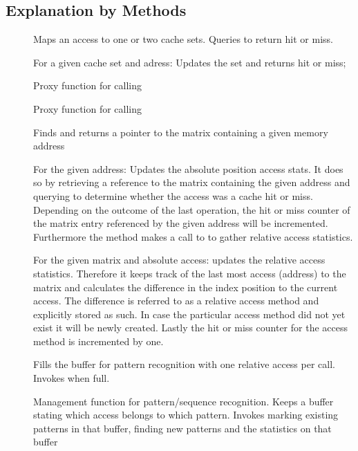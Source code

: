 \subsection{Explanation by Methods}

\begin{description} %
\item[] Maps an access to one or two cache sets. Queries  to return hit or miss.
\item[] For a given cache set and adress: Updates the set and returns hit or miss;
\item[] Proxy function for calling 
\item[] Proxy function for calling 
\item[] Finds and returns a pointer to the matrix containing a given memory address
\item[] For the given address: Updates the absolute position
    access stats. It does so by retrieving a reference to the matrix containing the given address and
    querying  to determine whether the access was a cache hit or miss. Depending on the outcome
    of the last operation, the hit or miss counter of the matrix entry referenced by the given address will be incremented.
    Furthermore the method makes a call to  to gather relative access statistics.
\item[] For
    the given matrix and absolute access: updates the relative access statistics. Therefore it keeps track of the last most
    access (address) to the matrix and calculates the difference in the index position to the current access. The
    difference is referred to as a relative access method and explicitly stored as such. In case the particular access
    method did not yet exist it will be newly created. Lastly the hit or miss counter for the access method is incremented
    by one.
\item[] Fills the buffer for pattern recognition with one relative access per call. Invokes  when full.
\item[] Management function for pattern/sequence recognition. Keeps a buffer stating which access belongs to which pattern. Invokes marking existing patterns in that buffer, finding new patterns and the statistics on that buffer

\end{description}
